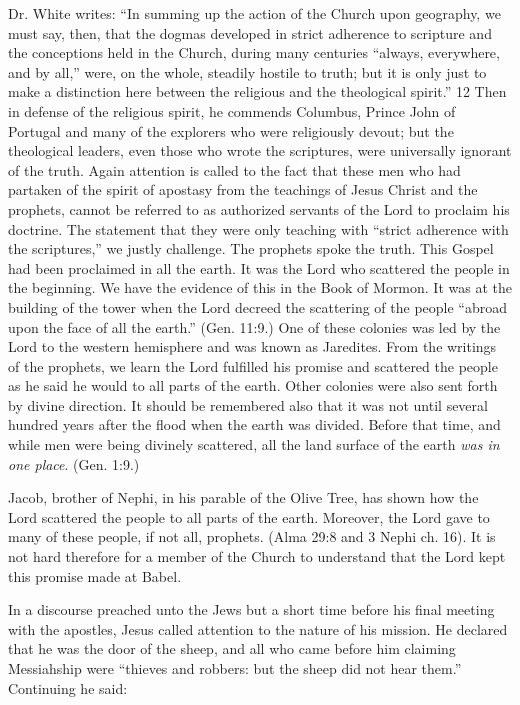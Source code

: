 Dr. White writes: ``In summing up the action of the Church upon geography, we must say,
then, that the dogmas developed in strict adherence to scripture and the conceptions held in
the Church, during many centuries ``always, everywhere, and by all,'' were, on the whole,
steadily hostile to truth; but it is only just to make a distinction here between the religious
and the theological spirit.'' 12 Then in defense of the religious spirit, he commends
Columbus, Prince John of Portugal and many of the explorers who were religiously devout;
but the theological leaders, even those who wrote the scriptures, were universally ignorant of
the truth. Again attention is called to the fact that these men who had partaken of the spirit of
apostasy from the teachings of Jesus Christ and the prophets, cannot be referred to as
authorized servants of the Lord to proclaim his doctrine. The statement that they were only
teaching with ``strict adherence with the scriptures,'' we justly challenge. The prophets spoke
the truth. This Gospel had been proclaimed in all the earth. It was the Lord who scattered the
people in the beginning. We have the evidence of this in the Book of Mormon. It was at the
building of the tower when the Lord decreed the scattering of the people ``abroad upon the
face of all the earth.'' (Gen. 11:9.) One of these colonies was led by the Lord to the western
hemisphere and was known as Jaredites. From the writings of the prophets, we learn the Lord
fulfilled his promise and scattered the people as he said he would to all parts of the earth.
Other colonies were also sent forth by divine direction. It should be remembered also that it
was not until several hundred years after the flood when the earth was divided. Before that
time, and while men were being divinely scattered, all the land surface of the earth \textit{was in
one place}. (Gen. 1:9.)

Jacob, brother of Nephi, in his parable of the Olive Tree, has shown how the Lord scattered
the people to all parts of the earth. Moreover, the Lord gave to many of these people, if not
all, prophets. (Alma 29:8 and 3 Nephi ch. 16). It is not hard therefore for a member of the
Church to understand that the Lord kept this promise made at Babel.

In a discourse preached unto the Jews but a short time before his final meeting with the
apostles, Jesus called attention to the nature of his mission. He declared that he was the door
of the sheep, and all who came before him claiming Messiahship were ``thieves and robbers:
but the sheep did not hear them.'' Continuing he said:

